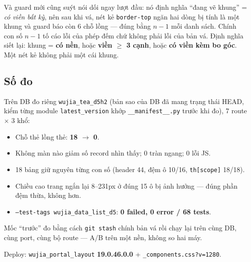 Và guard mới cũng suýt nói dối ngay lượt đầu: nó định nghĩa ``đang vẽ khung'' = \emph{có viền bất
kỳ}, nên sau khi vá, nét kẻ \texttt{border-top} ngăn hai dòng bị tính là một khung và guard báo còn
6 chỗ lồng --- đúng bằng $n-1$ mỗi danh sách. Chính con số $n-1$ tố cáo lỗi của phép đếm chứ không
phải lỗi của bản vá. Định nghĩa siết lại: khung = \textbf{có nền}, hoặc \textbf{viền $\ge$ 3 cạnh},
hoặc \textbf{có viền kèm bo góc}. Một nét kẻ không phải một cái khung.

\subsection*{Số đo}

Trên DB đo riêng \texttt{wujia\_tea\_d5h2} (bản sao của DB đã mang trạng thái HEAD, kiểm từng module
\texttt{latest\_version} khớp \texttt{\_\_manifest\_\_.py} trước khi đo), 7 route $\times$ 3 khổ:

\begin{itemize}
\item Chỗ thẻ lồng thẻ: \textbf{18 $\to$ 0}.
\item Không màn nào giảm số record nhìn thấy; 0 tràn ngang; 0 lỗi JS.
\item 18 bảng giữ nguyên từng con số (header 44, đệm ô 10/16, \texttt{th[scope]} 18/18).
\item Chiều cao trang ngắn lại 8--231px ở đúng 15 ô bị ảnh hưởng --- đúng phần đệm thừa, không hơn.
\item \texttt{--test-tags wujia\_data\_list\_d5}: \textbf{0 failed, 0 error / 68 tests}.
\end{itemize}

Mốc ``trước'' đo bằng cách \texttt{git stash} chính bản vá rồi chạy lại trên cùng DB, cùng port,
cùng bộ route --- A/B trên một nền, không so hai máy.

Deploy: \texttt{wujia\_portal\_layout} \textbf{19.0.46.0.0} + \texttt{\_components.css?v=1280}.
